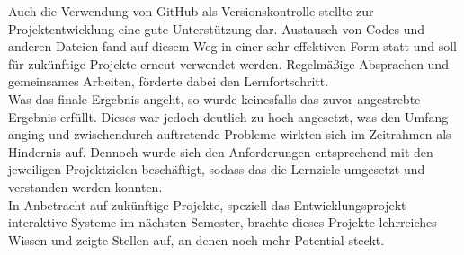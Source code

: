 Auch die Verwendung von GitHub als Versionskontrolle stellte zur Projektentwicklung eine gute Unterstützung dar. Austausch von Codes und anderen Dateien fand auf diesem Weg in einer sehr effektiven Form statt und soll für zukünftige Projekte erneut verwendet werden. Regelmäßige Absprachen und gemeinsames Arbeiten, förderte dabei den Lernfortschritt.\\
Was das finale Ergebnis angeht, so wurde keinesfalls das zuvor angestrebte Ergebnis erfüllt. Dieses war jedoch deutlich zu hoch angesetzt, was den Umfang anging und zwischendurch auftretende Probleme wirkten sich im Zeitrahmen als Hindernis auf.
Dennoch wurde sich den Anforderungen entsprechend mit den jeweiligen Projektzielen beschäftigt, sodass das die Lernziele umgesetzt und verstanden werden konnten.\\

In Anbetracht auf zukünftige Projekte, speziell das Entwicklungsprojekt interaktive Systeme im nächsten Semester, brachte dieses Projekte lehrreiches Wissen und zeigte Stellen auf, an denen noch mehr Potential steckt. 

\newpage
